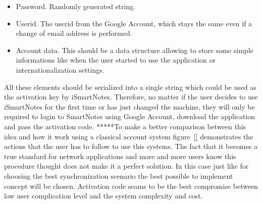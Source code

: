 \begin{itemize}
\item{Password. Randomly generated string.}
\item{Userid. The userid from the Google Account, which stays the same even if a change of email address is performed.}
\item{Account data. This should be a data structure allowing to store some simple informations like when the user started to use the application or internationalization settings.}
\end{itemize}
All these elements should be serialized into a single string which could be used as the activation key by iSmartNotes. Therefore, no matter if the user decides to use iSmartNotes for the first time or has just changed the machine, they will only be required to login to SmartNotes using Google Account, download the application and pass the activation code. *****To make a better comparison between this idea and how it work using a classical account system figure~\ref{} demonstrates the actions that the user has to follow to use this systems. The fact that it becomes a true standard for network applications and more and more users know this procedure thought does not make it a perfect solution. In this case just like for choosing the best synchronization scenario the best possible to implement concept will be chosen. Activation code seams to be the best compromise between low user complication level and the system complexity and cost.     

